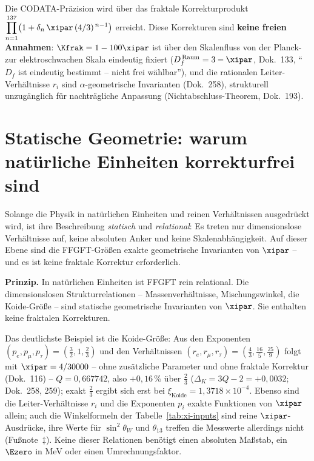 \begin{table}[htbp]
  Die CODATA-Präzision wird über das fraktale Korrekturprodukt
  $\displaystyle\prod_{n=1}^{137}\!\big(1+\delta_n\,\xipar\,(4/3)^{\,n-1}\big)$
  erreicht. Diese Korrekturen sind \textbf{keine freien Annahmen}:
  $\Kfrak=1-100\xipar$ ist über den Skalenfluss von der Planck- zur
  elektroschwachen Skala eindeutig fixiert ($D_f^{\,\mathrm{Raum}}=3-\xipar$,
  Dok.~133, ``$D_f$ ist eindeutig bestimmt -- nicht frei wählbar''), und die
  rationalen Leiter-Verhältnisse $r_i$ sind $\alpha$-geometrische Invarianten
  (Dok.~258), strukturell unzugänglich für nachträgliche Anpassung
  (Nichtabschluss-Theorem, Dok.~193).
\end{table}

\section{Statische Geometrie: warum natürliche Einheiten korrekturfrei sind}

Solange die Physik in natürlichen Einheiten und reinen Verhältnissen ausgedrückt
wird, ist ihre Beschreibung \emph{statisch} und \emph{relational}: Es treten nur
dimensionslose Verhältnisse auf, keine absoluten Anker und keine
Skalenabhängigkeit. Auf dieser Ebene sind die FFGFT-Größen exakte geometrische
Invarianten von $\xipar$ -- und es ist keine fraktale Korrektur erforderlich.

\begin{prinzip}
\textbf{Prinzip.} In natürlichen Einheiten ist FFGFT rein relational. Die
dimensionslosen Strukturrelationen -- Massenverhältnisse, Mischungswinkel, die
Koide-Größe -- sind statische geometrische Invarianten von $\xipar$. Sie
enthalten keine fraktalen Korrekturen.
\end{prinzip}

Das deutlichste Beispiel ist die Koide-Größe: Aus den Exponenten
$(p_e,p_\mu,p_\tau)=(\tfrac{3}{2},1,\tfrac{2}{3})$ und den Verhältnissen
$(r_e,r_\mu,r_\tau)=(\tfrac{4}{3},\tfrac{16}{5},\tfrac{25}{9})$ folgt mit
$\xipar=4/30000$ -- ohne zusätzliche Parameter und ohne fraktale Korrektur
(Dok.~116) -- $Q=0{,}667742$, also $+0{,}16\,\%$ über $\tfrac{2}{3}$
($\Delta_K=3Q-2=+0{,}0032$; Dok.~258, 259); exakt $\tfrac{2}{3}$ ergibt sich
erst bei $\xi_{\text{Koide}}=1{,}3718\times10^{-4}$. Ebenso sind die
Leiter-Verhältnisse $r_i$ und die Exponenten $p_i$ exakte Funktionen von
$\xipar$ allein; auch die Winkelformeln der
Tabelle~\ref{tab:xi-inputs} sind reine $\xipar$-Ausdrücke, ihre Werte für
$\sin^2\theta_W$ und $\theta_{13}$ treffen die Messwerte allerdings nicht
(Fußnote~$\ddagger$). Keine dieser Relationen
benötigt einen absoluten Maßstab, ein $\Ezero$ in MeV oder einen
Umrechnungsfaktor.

